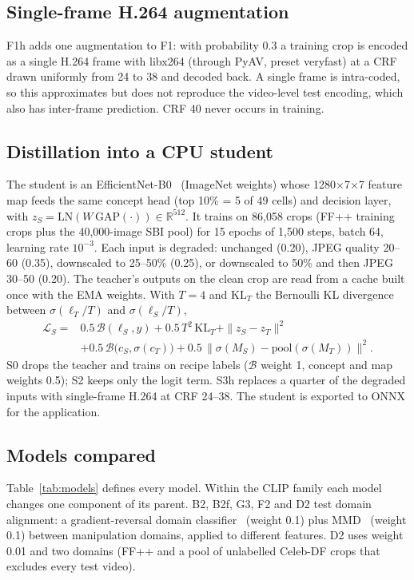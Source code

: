 \documentclass[conference]{IEEEtran}
\begin{document}
\subsection{Single-frame H.264 augmentation}
F1h adds one augmentation to F1: with probability 0.3 a training crop is encoded as a single H.264 frame with
libx264 (through PyAV, preset veryfast) at a CRF drawn uniformly from 24 to 38 and decoded back. A single frame is
intra-coded, so this approximates but does not reproduce the video-level test encoding, which also has inter-frame
prediction. CRF 40 never occurs in training.

\subsection{Distillation into a CPU student}\label{sec:kd}
The student is an EfficientNet-B0~\cite{efficientnet} (ImageNet weights) whose 1280$\times$7$\times$7 feature map
feeds the same concept head (top 10\% = 5 of 49 cells) and decision layer, with
$z_S=\mathrm{LN}(W\,\mathrm{GAP}(\cdot))\in\mathbb{R}^{512}$. It trains on 86,058 crops (FF++ training crops plus
the 40,000-image SBI pool) for 15 epochs of 1,500 steps, batch 64, learning rate $10^{-3}$. Each input is degraded:
unchanged (0.20), JPEG quality 20--60 (0.35), downscaled to 25--50\% (0.25), or downscaled to 50\% and then JPEG
30--50 (0.20). The teacher's outputs on the clean crop are read from a cache built once with the EMA weights. With
$T=4$ and $\mathrm{KL}_T$ the Bernoulli KL divergence between $\sigma(\ell_T/T)$ and $\sigma(\ell_S/T)$,
\begin{align}
\mathcal{L}_S = {} & 0.5\,\mathcal{B}(\ell_S,y) + 0.5\,T^2\,\mathrm{KL}_T + \|z_S - z_T\|^2 \nonumber\\
& + 0.5\,\mathcal{B}\bigl(c_S, \sigma(c_T)\bigr) + 0.5\,\bigl\|\sigma(M_S) - \mathrm{pool}(\sigma(M_T))\bigr\|^2 .
\label{eq:kd}
\end{align}
S0 drops the teacher and trains on recipe labels ($\mathcal{B}$ weight 1, concept and map weights 0.5); S2 keeps only
the logit term. S3h replaces a quarter of the degraded inputs with single-frame H.264 at CRF 24--38. The student is
exported to ONNX for the application.

\subsection{Models compared}\label{sec:models}
Table~\ref{tab:models} defines every model. Within the CLIP family each model changes one component of its parent.
B2, B2f, G3, F2 and D2 test domain alignment: a gradient-reversal domain classifier~\cite{ganin} (weight 0.1) plus
MMD~\cite{mmd} (weight 0.1) between manipulation domains, applied to different features. D2 uses weight 0.01 and
two domains (FF++ and a pool of unlabelled Celeb-DF crops that excludes every test video).
\end{document}
